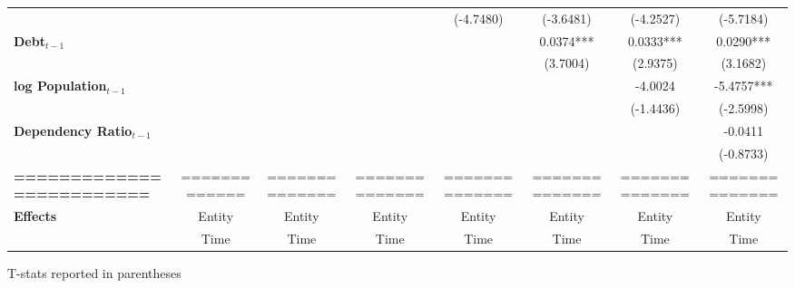 \begin{center}
\begin{tabular}{lccccccc}
\textbf{ }                         &                   &                      &                           &     (-4.7480)      &    (-3.6481)    &         (-4.2527)         &          (-5.7184)            \\
\textbf{Debt$_{t-1}$}                &                   &                      &                           &                    &    0.0374***    &         0.0333***         &          0.0290***            \\
\textbf{ }                         &                   &                      &                           &                    &     (3.7004)    &          (2.9375)         &           (3.1682)            \\
\textbf{log Population$_{t-1}$}      &                   &                      &                           &                    &                 &          -4.0024          &          -5.4757***           \\
\textbf{ }                         &                   &                      &                           &                    &                 &         (-1.4436)         &          (-2.5998)            \\
\textbf{Dependency Ratio$_{t-1}$}   &                   &                      &                           &                    &                 &                           &           -0.0411             \\
\textbf{ }                         &                   &                      &                           &                    &                 &                           &          (-0.8733)            \\
\textbf{=========================} &   =============   &    ==============    &       ==============      &   ==============   &  ============== &       ==============      &        ==============         \\
\textbf{Effects}                   &       Entity      &        Entity        &           Entity          &       Entity       &      Entity     &           Entity          &            Entity             \\
\textbf{}                          &        Time       &         Time         &            Time           &        Time        &       Time      &            Time           &             Time              \\
\bottomrule
\end{tabular}
\end{center}

T-stats reported in parentheses